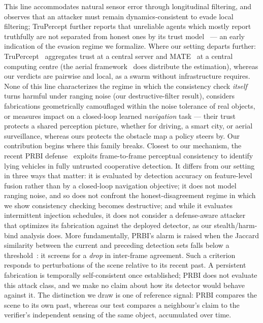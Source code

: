 This line accommodates natural sensor error through longitudinal filtering,
and observes that an attacker must remain dynamics-consistent to evade local
filtering; TruPercept further reports that unreliable agents which mostly
report truthfully are not separated from honest ones by its trust
model~\cite{trupercept2020} --- an early indication of the evasion regime we
formalize. Where our setting departs further:
TruPercept~\cite{trupercept2020} aggregates trust at a central server and
MATE~\cite{mate2025} at a central computing centre (the aerial
framework~\cite{aerialtrust2025} does distribute the estimation), whereas
our verdicts are pairwise and local, as a swarm without infrastructure
requires. None of this line
characterizes the regime in which the consistency check \emph{itself} turns
harmful under ranging noise (our destructive-filter result), considers
fabrications geometrically camouflaged within the noise tolerance of real
objects, or measures impact on a closed-loop learned \emph{navigation} task
--- their trust protects a shared perception picture, whether for driving, a
smart city, or aerial surveillance, whereas ours protects the obstacle map a
policy steers by. Our contribution begins where this family breaks. Closest to our mechanism,
the recent PRBI defense~\cite{prbi2026} exploits frame-to-frame perceptual
consistency to identify lying vehicles in fully untrusted cooperative
detection. It differs from our setting in three ways that matter: it is
evaluated by detection accuracy on feature-level fusion rather than by a
closed-loop navigation objective; it does not model ranging noise, and so
does not confront the honest-disagreement regime in which we show
consistency checking becomes destructive; and while it evaluates
intermittent injection schedules, it does not consider a defense-aware
attacker that optimizes its fabrication against the deployed detector, as
our stealth/harm-bind analysis does. More fundamentally, PRBI's alarm is
raised when the Jaccard similarity between the current and preceding
detection sets falls below a threshold~\cite{prbi2026}: it screens for a
\emph{drop} in inter-frame agreement. Such a criterion responds to
perturbations of the scene relative to its recent past. A
persistent fabrication is temporally self-consistent once established;
PRBI does not evaluate this attack class, and we make no claim about how
its detector would behave against it. The
distinction we draw is one of reference signal: PRBI compares the scene to
its own past, whereas our test compares a neighbour's claim to the
verifier's independent sensing of the same object, accumulated over time.

